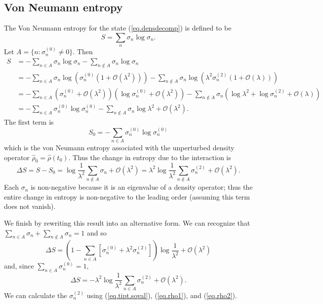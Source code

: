 \documentclass[11pt]{article}
\newcommand{\Od}[1]{\mathcal{O}{\left(#1\right)}}
\newcommand{\op}[1]{\hat{#1}}
\theoremstyle{theorem}
\theoremstyle{remark}
\theoremstyle{step}
\theoremstyle{gap}
\begin{document}
\subsection{Von Neumann entropy}

The Von Neumann entropy for the state (\ref{eq.densdecomp}) is defined to be
\[
S = \sum_{n} \sigma_n \log \sigma_n.
\]
Let \(A = \{n : \sigma_n^{(0)} \neq 0\}\). Then
\begin{align*}
S &= -\sum_{n \in A} \sigma_n \log \sigma_n-\sum_{n \not\in A} \sigma_n \log \sigma_n \\
&= - \sum_{n \in A} \sigma_n \log \left(\sigma_n^{(0)} \left(1 + \Od{\lambda^2}\right)\right)  - \sum_{n \not\in A} \sigma_n \log\left(\lambda^2\sigma_n^{(2)}\left(1 + \Od{\lambda}\right)\right) \\
&= - \sum_{n \in A} \left(\sigma_n^{(0)} + \Od{\lambda^2}\right) \left(\log \sigma_n^{(0)}+\Od{\lambda^2}\right) - \sum_{n \not\in A} \sigma_n \left(\log\lambda^2+\log\sigma_n^{(2)}+ \Od{\lambda}\right) \\
&= - \sum_{n \in A} \sigma_n^{(0)} \log \sigma_n^{(0)} -\sum_{n \not\in A} \sigma_n \log\lambda^2+ \Od{\lambda^2}.
\end{align*}
The first term is
\[S_0 = - \sum_{n \in A} \sigma_n^{(0)} \log \sigma_n^{(0)}\]
which is the von Neumann entropy associated with the unperturbed density operator \(\op{\rho}_0 = \op{\rho}\left(t_0\right)\). Thus the change in entropy due to the interaction is
\begin{equation}\label{eq.entropyresultnotA}
{\Delta S = S-S_0 = \log\frac{1}{\lambda^2}\sum_{n \not\in A} \sigma_n + \Od{\lambda^2} = \lambda^2 \log\frac{1}{\lambda^2} \sum_{n \not\in A}\sigma_n^{(2)}+ \Od{\lambda^2}.}
\end{equation}
Each \(\sigma_n\) is non-negative because it is an eigenvalue of a density operator; thus the entire change in entropy is non-negative to the leading order (assuming this term does not vanish).

We finish by rewriting this result into an alternative form. We can recognize that \(\sum_{n\in A} \sigma_n + \sum_{n \not\in A} \sigma_n = 1\) and so
\[
\Delta S = \left(1- \sum_{n\in A} \left[\sigma_n^{(0)}+\lambda^2 \sigma_n^{(2)}\right]\right)\log\frac{1}{\lambda^2} + \Od{\lambda^2}
\]
and, since \(\sum_{n \in A} \sigma_n^{(0)} = 1\),
\begin{equation}\label{eq.entropyresult}
\boxed{\Delta S = -\lambda^2 \log\frac{1}{\lambda^2}\sum_{n \in A} \sigma_n^{(2)} + \Od{\lambda^2}.}
\end{equation}
We can calculate the \(\sigma_n^{(2)}\) using (\ref{eq.tipt.soval}), (\ref{eq.rho1}), and (\ref{eq.rho2}).
\end{document}
